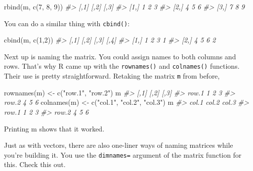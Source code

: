 \documentclass[
]{book}
\newenvironment{Shaded}{\begin{snugshade}}{\end{snugshade}}
\newcommand{\CommentTok}[1]{\textcolor[rgb]{0.56,0.35,0.01}{\textit{#1}}}
\newcommand{\DecValTok}[1]{\textcolor[rgb]{0.00,0.00,0.81}{#1}}
\newcommand{\FunctionTok}[1]{\textcolor[rgb]{0.00,0.00,0.00}{#1}}
\newcommand{\NormalTok}[1]{#1}
\newcommand{\OtherTok}[1]{\textcolor[rgb]{0.56,0.35,0.01}{#1}}
\newcommand{\StringTok}[1]{\textcolor[rgb]{0.31,0.60,0.02}{#1}}
\begin{document}
\begin{Shaded}
\begin{Highlighting}[]
\FunctionTok{rbind}\NormalTok{(m, }\FunctionTok{c}\NormalTok{(}\DecValTok{7}\NormalTok{, }\DecValTok{8}\NormalTok{, }\DecValTok{9}\NormalTok{))}
\CommentTok{\#\textgreater{}      [,1] [,2] [,3]}
\CommentTok{\#\textgreater{} [1,]    1    2    3}
\CommentTok{\#\textgreater{} [2,]    4    5    6}
\CommentTok{\#\textgreater{} [3,]    7    8    9}
\end{Highlighting}
\end{Shaded}

You can do a similar thing with \texttt{cbind()}:

\begin{Shaded}
\begin{Highlighting}[]
\FunctionTok{cbind}\NormalTok{(m, }\FunctionTok{c}\NormalTok{(}\DecValTok{1}\NormalTok{,}\DecValTok{2}\NormalTok{))}
\CommentTok{\#\textgreater{}      [,1] [,2] [,3] [,4]}
\CommentTok{\#\textgreater{} [1,]    1    2    3    1}
\CommentTok{\#\textgreater{} [2,]    4    5    6    2}
\end{Highlighting}
\end{Shaded}

Next up is naming the matrix. You could assign names to both columns and rows. That's why R came up with the \texttt{rownames()} and \texttt{colnames()} functions. Their use is pretty straightforward. Retaking the matrix \texttt{m} from before,

\begin{Shaded}
\begin{Highlighting}[]
\FunctionTok{rownames}\NormalTok{(m) }\OtherTok{\textless{}{-}} \FunctionTok{c}\NormalTok{(}\StringTok{"row.1"}\NormalTok{, }\StringTok{"row.2"}\NormalTok{)}
\NormalTok{m}
\CommentTok{\#\textgreater{}       [,1] [,2] [,3]}
\CommentTok{\#\textgreater{} row.1    1    2    3}
\CommentTok{\#\textgreater{} row.2    4    5    6}
\FunctionTok{colnames}\NormalTok{(m) }\OtherTok{\textless{}{-}} \FunctionTok{c}\NormalTok{(}\StringTok{"col.1"}\NormalTok{, }\StringTok{"col.2"}\NormalTok{, }\StringTok{"col.3"}\NormalTok{)}
\NormalTok{m}
\CommentTok{\#\textgreater{}       col.1 col.2 col.3}
\CommentTok{\#\textgreater{} row.1     1     2     3}
\CommentTok{\#\textgreater{} row.2     4     5     6}
\end{Highlighting}
\end{Shaded}

Printing m shows that it worked.

Just as with vectors, there are also one-liner ways of naming matrices while you're building it. You use the \texttt{dimnames=} argument of the matrix function for this. Check this out.
\end{document}
